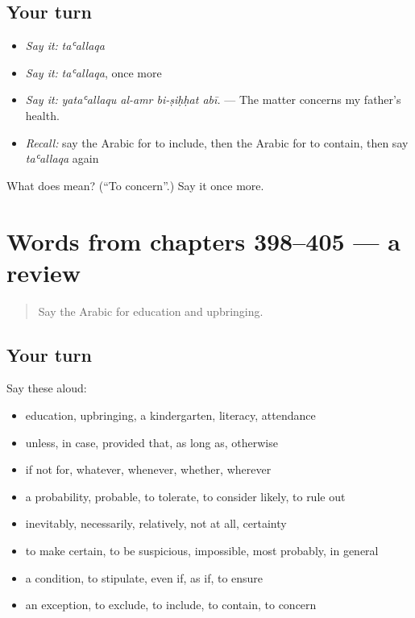 \subsection*{Your turn}
\begin{itemize}
\raggedright
  \item \emph{Say it:} \emph{taʿallaqa}
  \item \emph{Say it:} \emph{taʿallaqa}, once more
  \item \emph{Say it:} \emph{yataʿallaqu al-amr bi-ṣiḥḥat abī.} — The matter concerns my father's health.
  \item \emph{Recall:} say the Arabic for to include, then the Arabic for to contain, then say \emph{taʿallaqa} again
\end{itemize}

\begin{tcolorbox}[breakable,colback=teal!4,colframe=teal!35!black,title={Before you move on}]
What does  mean? (\textquotedblleft{}To concern\textquotedblright{}.) Say it once more.
\end{tcolorbox}
\section[(dialogue)]{Words from chapters 398–405 — a review}

\label{lesson:AR-R405-review-398-405}



\begin{quote}
Say the Arabic for education and upbringing.
\end{quote}

\subsection*{Your turn}
Say these aloud:

\begin{itemize}
\raggedright
  \item education, upbringing, a kindergarten, literacy, attendance
  \item unless, in case, provided that, as long as, otherwise
  \item if not for, whatever, whenever, whether, wherever
  \item a probability, probable, to tolerate, to consider likely, to rule out
  \item inevitably, necessarily, relatively, not at all, certainty
  \item to make certain, to be suspicious, impossible, most probably, in general
  \item a condition, to stipulate, even if, as if, to ensure
  \item an exception, to exclude, to include, to contain, to concern
\end{itemize}

